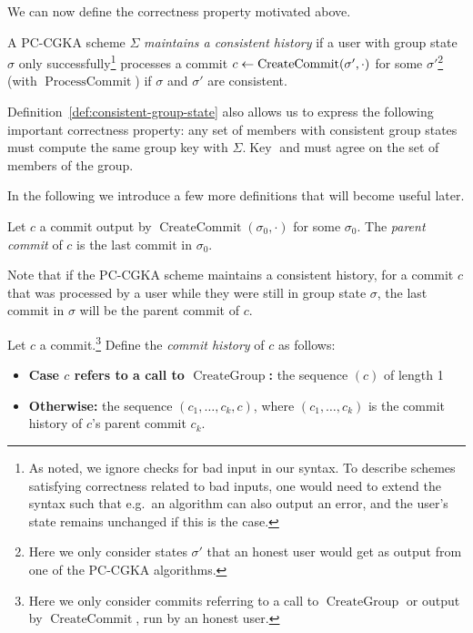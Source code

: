 We can now define the correctness property motivated above.

\begin{definition} \label{def:cgka-correctness-consistent-history}
	A PC-CGKA scheme $\Sigma$ \emph{maintains a consistent history} if a user with group state $\sigma$ only successfully\footnote{As noted, we ignore checks for bad input in our syntax. To describe schemes satisfying correctness related to bad inputs, one would need to extend the syntax such that e.g.\ an algorithm can also output an error, and the user's state remains unchanged if this is the case.} processes a commit $c \leftarrow \operatorname{CreateCommit}(\sigma', \cdot)$ for some $\sigma'$\footnote{Here we only consider states $\sigma'$ that an honest user would get as output from one of the PC-CGKA algorithms.} (with $\operatorname{ProcessCommit}$) if $\sigma$ and $\sigma'$ are consistent.
\end{definition}

Definition~\ref{def:consistent-group-state} also allows us to express the following important correctness property: any set of members with consistent group states must compute the same group key with $\Sigma.\operatorname{Key}$ and must agree on the set of members of the group.

In the following we introduce a few more definitions that will become useful later.

\begin{definition}
	Let $c$ a commit output by $\operatorname{CreateCommit}(\sigma_0, \cdot)$ for some $\sigma_0$. The \emph{parent commit} of $c$ is the last commit in $\sigma_0$.
\end{definition}

Note that if the PC-CGKA scheme maintains a consistent history, for a commit $c$ that was processed by a user while they were still in group state $\sigma$, the last commit in $\sigma$ will be the parent commit of $c$.

\begin{definition} \label{def:commit-history}
	Let $c$ a commit.\footnote{Here we only consider commits referring to a call to $\operatorname{CreateGroup}$ or output by $\operatorname{CreateCommit}$, run by an honest user.} Define the \emph{commit history} of $c$ as follows:
	\begin{itemize}
		\item \textbf{Case $c$ refers to a call to $\operatorname{CreateGroup}$:} the sequence $(c)$ of length 1
		\item \textbf{Otherwise:} the sequence $(c_1, \ldots, c_k, c)$, where $(c_1, \ldots, c_k)$ is the commit history of $c$'s parent commit $c_k$.
	\end{itemize}
\end{definition}

